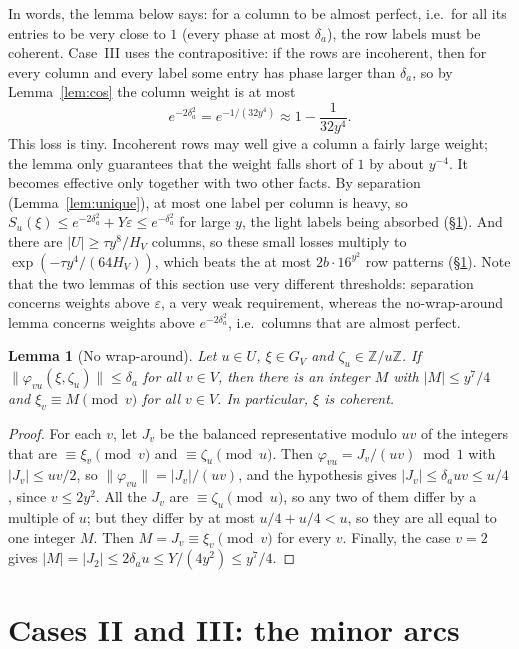 \documentclass[11pt]{amsart}
\newtheorem{lemma}[theorem]{Lemma}
\theoremstyle{definition}
\theoremstyle{remark}
\newcommand{\Z}{\mathbb{Z}}
\newcommand{\nint}[1]{\lVert #1\rVert}
\begin{document}
In words, the lemma below says: for a column to be almost perfect, i.e.\ for all its entries to be very close to $1$ (every phase at most $\delta_a$), the row labels must be coherent. Case~III uses the contrapositive: if the rows are incoherent, then for every column and every label some entry has phase larger than $\delta_a$, so by Lemma~\ref{lem:cos} the column weight is at most
\[
 e^{-2\delta_a^2}=e^{-1/(32y^4)}\approx1-\frac1{32y^4}.
\]
This loss is tiny. Incoherent rows may well give a column a fairly large weight; the lemma only guarantees that the weight falls short of $1$ by about $y^{-4}$. It becomes effective only together with two other facts. By separation (Lemma~\ref{lem:unique}), at most one label per column is heavy, so $S_u(\xi)\le e^{-2\delta_a^2}+Y\varepsilon\le e^{-\delta_a^2}$ for large $y$, the light labels being absorbed (\S\ref{sec:minor}). And there are $|U|\ge\tau y^8/H_V$ columns, so these small losses multiply to $\exp(-\tau y^4/(64H_V))$, which beats the at most $2b\cdot16^{y^2}$ row patterns (\S\ref{sec:minor}). Note that the two lemmas of this section use very different thresholds: separation concerns weights above $\varepsilon$, a very weak requirement, whereas the no-wrap-around lemma concerns weights above $e^{-2\delta_a^2}$, i.e.\ columns that are almost perfect.


\begin{lemma}[No wrap-around]\label{lem:admissible}
Let $u\in U$, $\xi\in G_V$ and $\zeta_u\in\Z/u\Z$. If $\nint{\varphi_{vu}(\xi,\zeta_u)}\le\delta_a$ for all $v\in V$, then there is an integer $M$ with $|M|\le y^7/4$ and $\xi_v\equiv M\pmod v$ for all $v\in V$. In particular, $\xi$ is coherent.
\end{lemma}
\begin{proof}
For each $v$, let $J_v$ be the balanced representative modulo $uv$ of the integers that are $\equiv\xi_v\pmod v$ and $\equiv\zeta_u\pmod u$. Then $\varphi_{vu}=J_v/(uv)\bmod1$ with $|J_v|\le uv/2$, so $\nint{\varphi_{vu}}=|J_v|/(uv)$, and the hypothesis gives $|J_v|\le\delta_auv\le u/4$, since $v\le2y^2$. All the $J_v$ are $\equiv\zeta_u\pmod u$, so any two of them differ by a multiple of $u$; but they differ by at most $u/4+u/4<u$, so they are all equal to one integer $M$. Then $M=J_v\equiv\xi_v\pmod v$ for every $v$. Finally, the case $v=2$ gives $|M|=|J_2|\le2\delta_au\le Y/(4y^2)\le y^7/4$.
\end{proof}

\section{Cases II and III: the minor arcs}\label{sec:minor}
\end{document}
